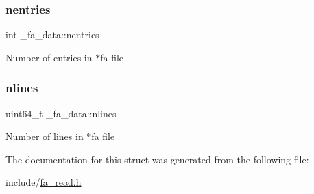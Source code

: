 \subsubsection{\texorpdfstring{nentries}{nentries}}
{\footnotesize\ttfamily int \+\_\+fa\+\_\+data\+::nentries}

Number of entries in $\ast$fa file \mbox{\label{struct__fa__data_a49ac64b09307f73104bbf1e650f3c2c5}} 
\subsubsection{\texorpdfstring{nlines}{nlines}}
{\footnotesize\ttfamily uint64\+\_\+t \+\_\+fa\+\_\+data\+::nlines}

Number of lines in $\ast$fa file 

The documentation for this struct was generated from the following file\+:\begin{DoxyCompactItemize}
\item 
include/\mbox{\hyperlink{fa__read_8h}{fa\+\_\+read.\+h}}\end{DoxyCompactItemize}
